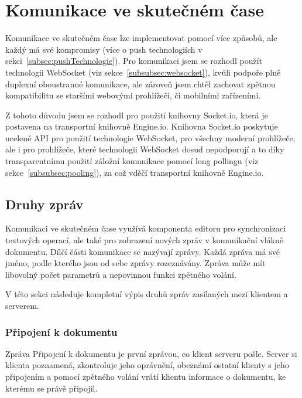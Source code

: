 
\section{Komunikace ve skutečném čase}\label{sec:komunikaceVeSkutečnémČase}

Komunikace ve skutečném čase lze implementovat pomocí více způsobů, ale každý má své kompromisy (více o push technologiích v sekci~\ref{subsec:pushTechnologie}).
Pro komunikaci jsem se rozhodl použít technologii WebSocket (viz sekce~\ref{subsubsec:websocket}), kvůli podpoře plně duplexní oboustranné komunikace, ale zároveň jsem chtěl zachovat zpětnou kompatibilitu se staršími webovými prohlížeči, či mobilními zařízeními.

Z tohoto důvodu jsem se rozhodl pro použití knihovny Socket.io, která je postavena na transportní knihovně Engine.io.
Knihovna Socket.io poskytuje ucelené \gls{API} pro použití technologie WebSocket, pro všechny moderní prohlížeče, ale i pro prohlížeče, které technologii WebSocket dosud nepodporují a to díky transparentnímu použití záložní komunikace pomocí long pollingu (viz sekce~\ref{subsubsec:pooling}), za což vděčí transportní knihovně Engine.io.

\subsection{Druhy zpráv}\label{subsec:druhyZprávyVeSkutečnémČase}

Komunikaci ve skutečném čase využívá komponenta editoru pro synchronizaci textových operací, ale také pro zobrazení nových zpráv v komunikační vlákně dokumentu.
Dílčí části komunikace se nazývají zprávy.
Každá zpráva má své jméno, podle kterého jsou od sebe zprávy rozeznávány.
Zpráva může mít libovolný počet parametrů a nepovinnou funkci zpětného volání.

V této sekci následuje kompletní výpis druhů zpráv zasílaných mezi klientem a serverem.

\subsubsection{Připojení k dokumentu} %

Zpráva Připojení k dokumentu je první zprávou, co klient serveru pošle.
Server si klienta poznamená, zkontroluje jeho oprávnění, obeznámí ostatní klienty s jeho připojením a pomocí zpětného volání vrátí klientu informace o dokumentu, ke kterému se právě připojil.

